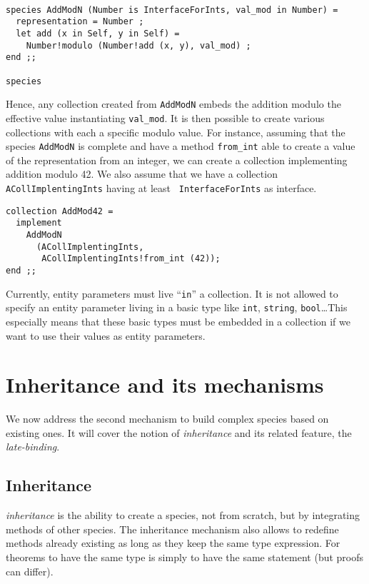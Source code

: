 {\scriptsize
\begin{lstlisting}

species AddModN (Number is InterfaceForInts, val_mod in Number) =
  representation = Number ;
  let add (x in Self, y in Self) =
    Number!modulo (Number!add (x, y), val_mod) ;
end ;;

species
\end{lstlisting}}

Hence, any collection created from {\tt AddModN} embeds the addition
modulo the effective value instantiating {\tt val\_mod}. It is then
possible to create various collections with each a specific modulo
value. For instance, assuming that the species {\tt AddModN} is
complete and have a method {\tt from\_int} able to create a value of
the representation from an integer, we can create a collection
implementing addition modulo 42. We also assume that we have a
collection {\tt ACollImplentingInts} having at least {\tt
InterfaceForInts} as interface.

 {\scriptsize
\begin{lstlisting}
collection AddMod42 =
  implement
    AddModN
      (ACollImplentingInts,
       ACollImplentingInts!from_int (42));
end ;;
\end{lstlisting}}


\smallskip

Currently, entity parameters must live ``{\tt in}'' a collection. It is not
allowed to specify an entity parameter living in a basic type like {\tt int},
{\tt string}, {\tt bool}\ldots This especially means that these basic types
must be embedded in a collection if we want to use their values as entity
parameters.



\section{Inheritance and its mechanisms}

We now address the second mechanism to build complex species
based on existing ones. It will cover the notion of {\em inheritance}
and its related feature, the {\em late-binding}.



\subsection{Inheritance}
\label{inheritance}
 {\focal} {\em inheritance} is the ability to create
a species, not from scratch, but by integrating methods of other
species.  The inheritance mechanism also allows to redefine methods
already existing as long as they keep the same type expression.  For
theorems to have the same type is simply to have the same statement
(but proofs can differ).

